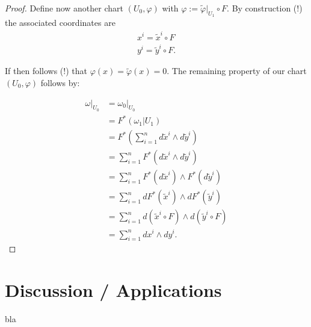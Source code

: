 \begin{proof}
Define now another chart $(U_0,\varphi)$ with $\varphi := \tilde{\varphi}|_{U_1} \circ  F$. By construction (!) the associated coordinates are
\begin{align*}
x^i = \tilde{x}^i \circ F \\
y^i = \tilde{y}^i \circ F.
\end{align*}

If then follows (!) that $\varphi(x) = \tilde{\varphi}(x) = 0$. The remaining property of our chart $(U_0,\varphi)$ follows by:

\begin{align*}
\omega|_{U_0} &= \omega_0|_{U_0} \\
&= F^* (\omega_1|{U_1}) \\
&= F^* \left( \sum^n_{i=1} d\tilde{x}^i \wedge d\tilde{y}^i \right) \\
&= \sum^n_{i=1} F^* (d\tilde{x}^i \wedge d\tilde{y}^i) \\
&= \sum^n_{i=1} F^*(d\tilde{x}^i) \wedge F^*(d\tilde{y}^i) \\
&= \sum^n_{i=1} d F^*(\tilde{x}^i) \wedge d F^*(\tilde{y}^i) \\
&= \sum^n_{i=1} d (\tilde{x}^i \circ F) \wedge d ( \tilde{y}^i \circ F) \\
&= \sum^n_{i=1} dx^i \wedge dy^i.
\end{align*}






\end{proof}

\section{Discussion / Applications}

bla

